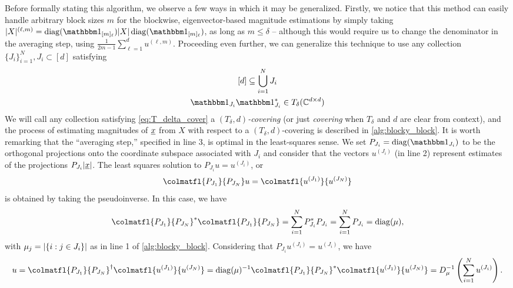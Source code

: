Before formally stating this algorithm, we observe a few ways in which it may be generalized.  Firstly, we notice that this method can easily handle arbitrary block sizes $m$ for the blockwise, eigenvector-based magnitude estimations by simply taking $\abs{X}^{(\ell, m)} = \diag(\one_{[m]_\ell}) \abs{X} \diag(\one_{[m]_\ell})$, as long as $m \le \delta$ -- although this would require us to change the denominator in the averaging step, using $\frac{1}{2 m - 1} \sum_{\ell = 1}^d u^{(\ell, m)}$.  Proceeding even further, we can generalize this technique to use any collection $\{J_i\}_{i = 1}^N, J_i \subset [d]$ satisfying \begin{equation} \begin{gathered} [d] \subset \bigcup_{i = 1}^N J_i \\ \one_{J_i} \one_{J_i}^* \in T_{\delta}(\Cdxd) \end{gathered} \label{eq:T_delta_cover}\end{equation}  We will call any collection satisfying \eqref{eq:T_delta_cover} a \emph{$(T_\delta, d)$-covering} (or just \emph{covering} when $T_\delta$ and $d$ are clear from context), and the process of estimating magnitudes of $\underline{x}$ from $X$ with respect to a $(T_\delta, d)$-covering is described in \cref{alg:blocky_block}.  It is worth remarking that the ``averaging step,'' specified in line 3, is optimal in the least-squares sense.  We set $P_{J_i} = \diag(\one_{J_i})$ to be the orthogonal projections onto the coordinate subspace associated with $J_i$ and consider that the vectors $u^{(J_i)}$ (in line 2) represent estimates of the projections $P_{J_i} \lvert\underline{x}\rvert$.  The least squares solution to $P_{J_i} u = u^{(J_i)}$, or \[\colmatfl{P_{J_1}}{P_{J_N}} u = \colmatfl{u^{(J_1)}}{u^{(J_N)}}\] is obtained by taking the pseudoinverse.  In this case, we have \[\colmatfl{P_{J_1}}{P_{J_N}}^* \colmatfl{P_{J_1}}{P_{J_N}} = \sum_{i = 1}^N P_{J_i}^* P_{J_i} = \sum_{i = 1}^N P_{J_i} = \diag(\mu),\] with $\mu_j = \lvert\{i : j \in J_i\}\rvert$ as in line 1 of \cref{alg:blocky_block}.  Considering that $P_{J_i} u^{(J_i)} = u^{(J_i)}$, we have \[u = \colmatfl{P_{J_1}}{P_{J_N}}^{\dag} \colmatfl{u^{(J_1)}}{u^{(J_N)}} =  \diag(\mu)^{-1} \colmatfl{P_{J_1}}{P_{J_N}}^* \colmatfl{u^{(J_1)}}{u^{(J_N)}} = D_\mu^{-1}\left(\sum_{i = 1}^N u^{(J_i)}\right).\]

